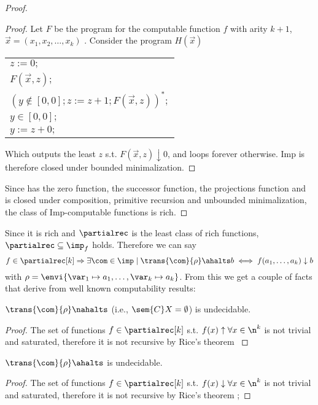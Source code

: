 \begin{proof}
  \begin{proof}
    Let \(F\) be the program for the computable function \(f\)
    with arity \(k+1\), \(\vec{x} = (x_1, x_2, \dots, x_k)\)
    . Consider the program \(H(\vec{x})\)
    \begin{center}
      \begin{tabular}{l}
        \(z := 0;\)\\[0pt]
        \(F(\vec{x},z);\)\\[0pt]
        \((y \not\in [0,0];z := z + 1;F(\vec{x},z))^*;\)\\[0pt]
        \(y\in [0,0];\)\\[0pt]
        \(y := z + 0;\)\\[0pt]
      \end{tabular}

    \end{center}
    Which outputs the least \(z\) s.t. \(F(\vec{x},z) \downarrow 0\),
    and loops forever otherwise. Imp is therefore closed under bounded
    minimalization.
  \end{proof}
  Since has the zero function, the successor function, the projections
  function and is closed under composition, primitive recursion and
  unbounded minimalization, the class of Imp-computable functions is
  rich.
\end{proof}

Since it is rich and \(\partialrec\) is the least class of rich
functions, \(\partialrec \subseteq \imp_f\) holds. Therefore we can
say \[f \in \partialrec[k] \Rightarrow \exists \com \in \imp \mid
\trans{\com}{\rho}\ahalts b \iff f(a_1, \dots, a_k) \downarrow b\]
with \(\rho = \envi{\var_1 \mapsto a_1, \dots, \var_k \mapsto a_k}\).
From this we get a couple of facts that derive from well known
computability results:
\begin{corollary}
  \(\trans{\com}{\rho} \nahalts\) (i.e., \(\sem{C}X = \emptyset\)) is
  undecidable.
\end{corollary}

\begin{proof}
  The set of functions \(f\in \partialrec[k]\) s.t.
  \(f(x) \uparrow \forall x \in \n^k\) is not trivial and saturated,
  therefore it is not recursive by Rice's theorem
  \cite{rice1953classes}
\end{proof}

\begin{corollary}
  \(\trans{\com}{\rho} \ahalts\) is undecidable.
\end{corollary}
\begin{proof}
  The set of functions \(f\in \partialrec[k]\) s.t.
  \(f(x) \downarrow \forall x \in \n^k\) is not trivial and saturated,
  therefore it is not recursive by Rice's theorem
  \cite{rice1953classes};
\end{proof}